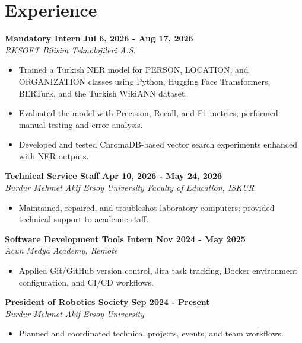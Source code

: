 
\section{Experience}

\textbf{Mandatory Intern} \hfill \textbf{Jul 6, 2026 - Aug 17, 2026} \\
\textit{RKSOFT Bilisim Teknolojileri A.S.}
\begin{itemize}
    \item Trained a Turkish NER model for PERSON, LOCATION, and ORGANIZATION classes using Python, Hugging Face Transformers, BERTurk, and the Turkish WikiANN dataset.
    \item Evaluated the model with Precision, Recall, and F1 metrics; performed manual testing and error analysis.
    \item Developed and tested ChromaDB-based vector search experiments enhanced with NER outputs.
\end{itemize}

\vspace{3pt}

\noindent \textbf{Technical Service Staff} \hfill \textbf{Apr 10, 2026 - May 24, 2026} \\
\textit{Burdur Mehmet Akif Ersoy University Faculty of Education, ISKUR}
\begin{itemize}
    \item Maintained, repaired, and troubleshot laboratory computers; provided technical support to academic staff.
\end{itemize}

\vspace{3pt}

\noindent \textbf{Software Development Tools Intern} \hfill \textbf{Nov 2024 - May 2025} \\
\textit{Acun Medya Academy, Remote}
\begin{itemize}
    \item Applied Git/GitHub version control, Jira task tracking, Docker environment configuration, and CI/CD workflows.
\end{itemize}

\vspace{3pt}

\noindent \textbf{President of Robotics Society} \hfill \textbf{Sep 2024 - Present} \\
\textit{Burdur Mehmet Akif Ersoy University}
\begin{itemize}
    \item Planned and coordinated technical projects, events, and team workflows.
\end{itemize}
